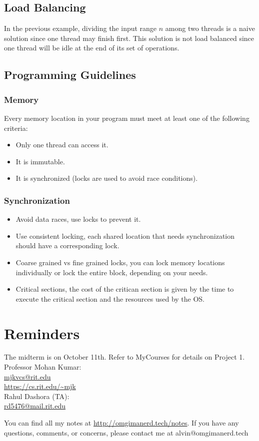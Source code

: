 \documentclass{math}
\begin{document}
\subsection*{Load Balancing}
In the previous example, dividing the input range \( n \) among two threads is
a naive solution since one thread may finish first. This solution is not load
balanced since one thread will be idle at the end of its set of operations.

\subsection*{Programming Guidelines}

\subsubsection*{Memory}
Every memory location in your program must meet at least one
of the following criteria:
\begin{itemize}
  \item Only one thread can access it.
  \item It is immutable.
  \item It is synchronized (locks are used to avoid race conditions).
\end{itemize}

\subsubsection*{Synchronization}
\begin{itemize}
  \item Avoid data races, use locks to prevent it.
  \item Use consistent locking, each shared location that needs synchronization
    should have a corresponding lock.
  \item Coarse grained vs fine grained locks, you can lock memory locations
    individually or lock the entire block, depending on your needs.
  \item Critical sections, the cost of the critican section is given by the
    time to execute the critical section and the resources used by the OS.
\end{itemize}

\section*{Reminders}
The midterm is on October 11th.
Refer to MyCourses for details on Project 1. \\

\noindent Professor Mohan Kumar: \\
\url{mjkvcs@rit.edu} \\
\url{https://cs.rit.edu/~mjk} \\

\noindent Rahul Dashora (TA): \\
\url{rd5476@mail.rit.edu} \\

\begin{center}
  You can find all my notes at \url{http://omgimanerd.tech/notes}. If you have
  any questions, comments, or concerns, please contact me at
  alvin@omgimanerd.tech
\end{center}
\end{document}
